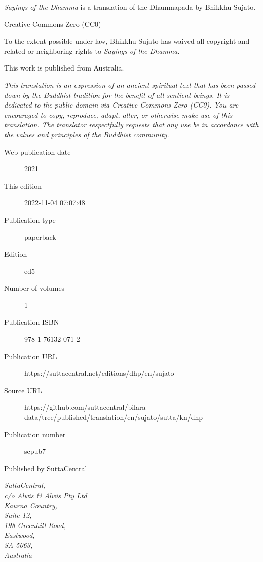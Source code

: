 \documentclass[12pt,openany]{book}%
\begin{document}
\begin{footnotesize}

\textit{Sayings of the Dhamma} is a translation of the Dhammapada by Bhikkhu Sujato.

\medskip

Creative Commons Zero (CC0)

To the extent possible under law, Bhikkhu Sujato has waived all copyright and related or neighboring rights to \textit{Sayings of the Dhamma}.

\medskip

This work is published from Australia.

\begin{center}
\textit{This translation is an expression of an ancient spiritual text that has been passed down by the Buddhist tradition for the benefit of all sentient beings. It is dedicated to the public domain via Creative Commons Zero (CC0). You are encouraged to copy, reproduce, adapt, alter, or otherwise make use of this translation. The translator respectfully requests that any use be in accordance with the values and principles of the Buddhist community.}
\end{center}

\medskip

\begin{description}
    \item[Web publication date] 2021
    \item[This edition] 2022-11-04 07:07:48
    \item[Publication type] paperback
    \item[Edition] ed5
    \item[Number of volumes] 1
    \item[Publication ISBN] 978-1-76132-071-2
    \item[Publication URL] https://suttacentral.net/editions/dhp/en/sujato
    \item[Source URL] https://github.com/suttacentral/bilara-data/tree/published/translation/en/sujato/sutta/kn/dhp
    \item[Publication number] scpub7
\end{description}

\medskip

Published by SuttaCentral

\medskip

\textit{SuttaCentral,\\
c/o Alwis \& Alwis Pty Ltd\\
Kaurna Country,\\
Suite 12,\\
198 Greenhill Road,\\
Eastwood,\\
SA 5063,\\
Australia}

\end{footnotesize}
\end{document}

